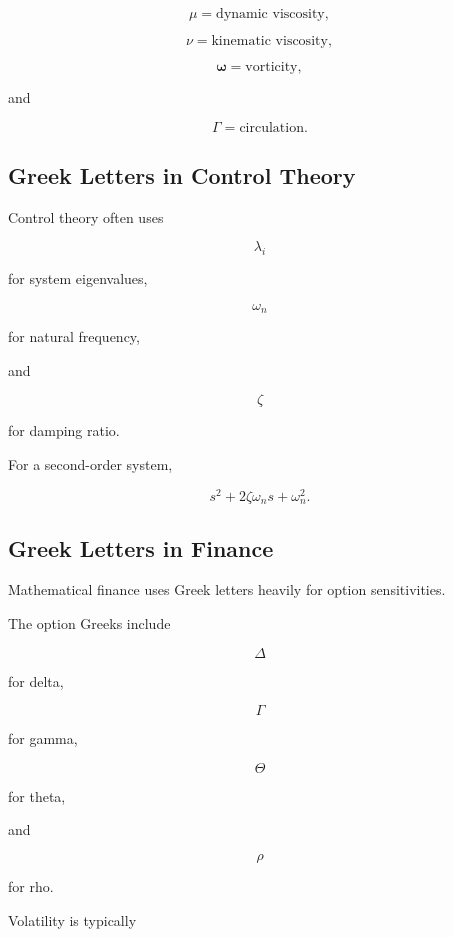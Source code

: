 \[
\boxed{
\mu
=
\text{dynamic viscosity},
}
\]

\[
\boxed{
\nu
=
\text{kinematic viscosity},
}
\]

\[
\boxed{
\boldsymbol{\omega}
=
\text{vorticity},
}
\]

and

\[
\boxed{
\Gamma
=
\text{circulation}.
}
\]

\subsection{Greek Letters in Control Theory}
\label{subsec:greek-control-uses}

Control theory often uses

\[
\boxed{
\lambda_i
}
\]

for system eigenvalues,

\[
\boxed{
\omega_n
}
\]

for natural frequency,

and

\[
\boxed{
\zeta
}
\]

for damping ratio.

For a second-order system,

\[
\boxed{
s^2
+
2\zeta\omega_ns
+
\omega_n^2.
}
\]

\subsection{Greek Letters in Finance}
\label{subsec:greek-finance-uses}

Mathematical finance uses Greek letters heavily for option sensitivities.

The option Greeks include

\[
\boxed{
\Delta
}
\]

for delta,

\[
\boxed{
\Gamma
}
\]

for gamma,

\[
\boxed{
\Theta
}
\]

for theta,

and

\[
\boxed{
\rho
}
\]

for rho.

Volatility is typically

